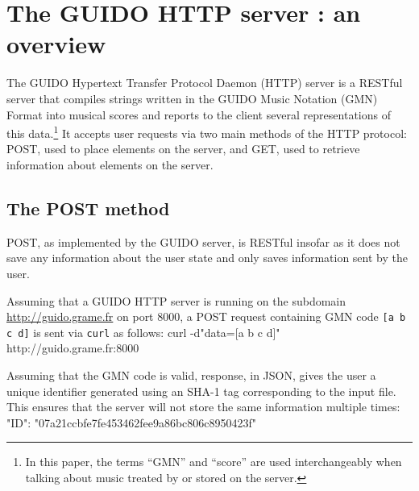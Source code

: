 \documentclass[11pt,a4paper]{article}
\newenvironment{code}		{\vspace{-2mm} \fontsize{8.5pt}{12pt}\selectfont \verbatim}{\endverbatim\vspace{-2mm}}
\begin{document}
\section{The GUIDO HTTP server : an overview}\label{section:overview}
The GUIDO Hypertext Transfer Protocol Daemon (HTTP) server is a RESTful server that compiles strings written in the GUIDO Music Notation (GMN) Format into musical scores and reports to the client several representations of this data.\footnote{In this paper, the terms ``GMN'' and ``score'' are used interchangeably when talking about music treated by or stored on the server.}  It accepts user requests via two main methods of the HTTP protocol: POST, used to place elements on the server, and GET, used to retrieve information about elements on the server.

\subsection{The POST method}\label{subsection:post}
POST, as implemented by the GUIDO server, is RESTful insofar as it does not save any information about the user state and only saves information sent by the user.\par
Assuming that a GUIDO HTTP server is running on the subdomain \url{http://guido.grame.fr} on port 8000, a POST request containing GMN code \verb=[a b c d]= is sent via \verb=curl= as follows:
\begin{code}
 curl -d"data=[a b c d]" http://guido.grame.fr:8000
\end{code}

Assuming that the GMN code is valid, response, in JSON, gives the user a unique identifier generated using an SHA-1 tag corresponding to the input file.  This ensures that the server will not store the same information multiple times:
\begin{code}
 {
  "ID": "07a21ccbfe7fe453462fee9a86bc806c8950423f"
 }
\end{code}
\end{document}
